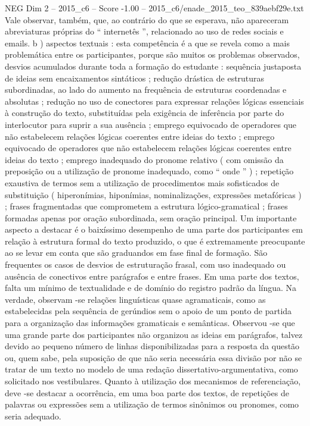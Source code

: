 \begin{textsample}{NEG Dim 2 – 2015\_c6 – Score -1.00 – 2015\_c6/enade\_2015\_teo\_839aebf29e.txt}
Vale observar, também, que, ao contrário do que se esperava, não apareceram abreviaturas próprias do “ internetês ”, relacionado ao uso de redes sociais e emails. b ) aspectos textuais : esta competência é a que se revela como a mais problemática entre os participantes, porque são muitos os problemas observados, desvios acumulados durante toda a formação do estudante : sequência justaposta de ideias sem encaixamentos sintáticos ; redução drástica de estruturas subordinadas, ao lado do aumento na frequência de estruturas coordenadas e absolutas ; redução no uso de conectores para expressar relações lógicas essenciais à construção do texto, substituídas pela exigência de inferência por parte do interlocutor para suprir a sua ausência ; emprego equivocado de operadores que não estabelecem relações lógicas coerentes entre ideias do texto ; emprego equivocado de operadores que não estabelecem relações lógicas coerentes entre ideias do texto ; emprego inadequado do pronome relativo ( com omissão da preposição ou a utilização de pronome inadequado, como “ onde ” ) ; repetição exaustiva de termos sem a utilização de procedimentos mais sofisticados de substituição ( hiperonímias, hiponímias, nominalizações, expressões metafóricas ) ; frases fragmentadas que comprometem a estrutura lógico-gramatical ; frases formadas apenas por oração subordinada, sem oração principal.
Um importante aspecto a destacar é o baixíssimo desempenho de uma parte dos participantes em relação à estrutura formal do texto produzido, o que é extremamente preocupante ao se levar em conta que são graduandos em fase final de formação.
São frequentes os casos de desvios de estruturação frasal, com uso inadequado ou ausência de conectivos entre parágrafos e entre frases.
Em uma parte dos textos, falta um mínimo de textualidade e de domínio do registro padrão da língua.
Na verdade, observam -se relações linguísticas quase agramaticais, como as estabelecidas pela sequência de gerúndios sem o apoio de um ponto de partida para a organização das informações gramaticais e semânticas.
Observou -se que uma grande parte dos participantes não organizou as ideias em parágrafos, talvez devido ao pequeno número de linhas disponibilizadas para a resposta da questão ou, quem sabe, pela suposição de que não seria necessária essa divisão por não se tratar de um texto no modelo de uma redação dissertativo-argumentativa, como solicitado nos vestibulares.
Quanto à utilização dos mecanismos de referenciação, deve -se destacar a ocorrência, em uma boa parte dos textos, de repetições de palavras ou expressões sem a utilização de termos sinônimos ou pronomes, como seria adequado.

\end{textsample}
